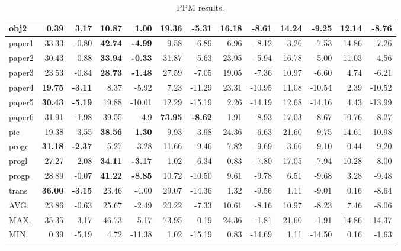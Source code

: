 \documentclass[runningheads,a4paper]{llncs}
\begin{document}
\begin{table}
{\begin{tabular}{l|rr|rr|rr|rr|rr|rr|}
\\ \hline
obj2 & 0.39 & 3.17 & 10.87 & 1.00 & \textbf{19.36} & \textbf{-5.31} & 16.18 & -8.61 & 14.24 & -9.25 & 12.14 & -8.76 \\
\hline
paper1 & 33.33 & -0.80 & \textbf{42.74} & \textbf{-4.99} & 9.58 & -6.89 & 6.96 & -8.12 & 3.26 & -7.53 & 14.86 & -7.26 \\
\hline
paper2 & 30.43 & 0.88 & \textbf{33.94} & \textbf{-0.33} & 31.87 & -5.63 & 23.95 & -5.94 & 16.78 & -5.00 & 11.03 & -4.56
\\ \hline
paper3 & 23.53 & -0.84 & \textbf{28.73} & \textbf{-1.48} & 27.59 & -7.05 & 19.05 & -7.36 & 10.97 & -6.60 & 4.74 & -6.21
\\ \hline
paper4 & \textbf{19.75} & \textbf{-3.11} & 8.37 & -5.92 & 7.23 & -11.29 & 23.31 & -10.95 & 11.08 & -10.54 & 2.39 &
-10.52 \\ \hline
paper5 & \textbf{30.43} & \textbf{-5.19} & 19.88 & -10.01 & 12.29 & -15.19 & 2.26 & -14.19 & 12.68 & -14.16 & 4.43 &
-13.99 \\ \hline
paper6 & 31.91 & -1.98 & 39.55 & -4.9 & \textbf{73.95} & \textbf{-8.62} & 1.91 & -8.93 & 17.03 & -8.67 & 10.76 & -8.27
\\ \hline
pic & 19.38 & 3.55 & \textbf{38.56} & \textbf{1.30} & 9.93 & -3.98 & 24.36 & -6.63 & 21.60 & -9.75 & 14.61 & -10.98 \\
\hline
progc & \textbf{31.18} & \textbf{-2.37} & 5.27 & -3.28 & 11.66 & -9.46 & 7.82 & -9.69 & 3.66 & -9.10 & 0.44 & -9.20 \\
\hline
progl & 27.27 & 2.08 & \textbf{34.11} & \textbf{-3.17} & 1.02 & -6.34 & 0.83 & -7.80 & 17.05 & -7.94 & 10.28 & -8.00 \\
\hline
progp & 28.89 & -0.07 & \textbf{41.22} & \textbf{-8.85} & 10.72 & -10.50 & 9.61 & -9.78 & 6.51 & -9.68 & 3.28 & -9.48 \\
\hline
trans & \textbf{36.00} & \textbf{-3.15} & 23.46 & -4.00 & 29.07 & -14.36 & 1.32 & -9.56 & 1.11 & -9.01 & 0.16 & -8.64 \\
\hline \hline
AVG.  & 23.86 & -0.63 & 25.67 & -2.49 & 20.22 & -7.33 & 10.61 & -8.16 & 10.97 & -8.23 & 7.46 & -8.06 \\ \hline
MAX.  & 35.35 &  3.17 & 46.73  &  5.17  & 73.95 & 0.19  & 24.36 & -1.81 & 21.60 & -1.91 & 14.86 & -14.37 \\ \hline
MIN.  &  0.39 & -5.19 &  4.72  & -11.38 &  1.02 & -15.19 & 0.83 & -14.69 & 1.11 & -14.50 & 0.16 & -1.63 \\ \hline
\multicolumn{13}{c}{} 
\end{tabular}
\caption{PPM results.}
\label{tab:results}
}
\end{table} 
\end{document}
